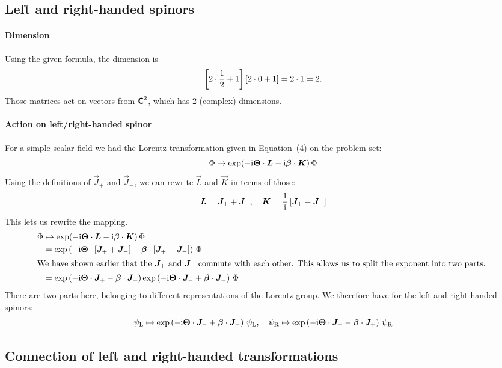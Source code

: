 \documentclass[11pt, english, fleqn, DIV=15, headinclude, BCOR=1cm]{scrartcl}
\begin{document}
\subsection{Left and right-handed spinors}

\paragraph{Dimension}

Using the given formula, the dimension is
\[
    \left[ 2 \cdot \frac12 + 1 \right] [2 \cdot 0 + 1] = 2 \cdot 1 = 2.
\]
Those matrices act on vectors from $\text{\bfseries\sffamily C}^2$, which has 2 (complex) dimensions.

\paragraph{Action on left/right-handed spinor}

For a simple scalar field we had the Lorentz transformation given in
Equation~(4) on the problem set:
\[
    \Phi \mapsto \exp(- \mathrm i \boldsymbol{\Theta} \cdot \boldsymbol{L} - \mathrm i \boldsymbol{\beta} \cdot
    \boldsymbol{K}) \, \Phi
\]
Using the definitions of $\vec J_+$ and $\vec J_-$, we can rewrite $\vec L$ and
$\vec K$ in terms of those:
\[
    \boldsymbol{L} = \boldsymbol{J}_+ + \boldsymbol{J}_-
    ,\quad
    \boldsymbol{K} = \frac1{\mathrm i} \left[ \boldsymbol{J}_+ - \boldsymbol{J}_- \right]
\]
This lets us rewrite the mapping.
\begin{align*}
    \Phi
    &\mapsto
    \exp(- \iup \vec \Theta \cdot \vec L - \iup \vec \beta \cdot
    \vec K) \, \Phi \\
    &= \exp\del{-\iup \vec\Theta\cdot\sbr{\vec J_+ + \vec J_-} - \vec
    \beta\cdot\sbr{\vec J_+ - \vec J_-}} \, \Phi \\
    \intertext{%
        We have shown earlier that the $\vec J_+$ and $\vec J_-$ commute with
        each other. This allows us to split the exponent into two parts.
    }
    &= \exp\del{-\iup \vec\Theta\cdot\vec J_+ - \vec \beta\cdot\vec J_+}
    \exp\del{-\iup \vec\Theta\cdot\vec J_- + \vec \beta\cdot \vec J_-}
    \, \Phi
\end{align*}
There are two parts here, belonging to different representations of the Lorentz
group. We therefore have for the left and right-handed spinors:
\[
    \psi_\text L \mapsto \exp\left( -\mathrm i \boldsymbol{\Theta}\cdot\boldsymbol{J}_- + \boldsymbol{\beta}\cdot \boldsymbol{J}_- \right) \,\psi_\text L
    ,\quad
    \psi_\text R \mapsto \exp\left( -\mathrm i \boldsymbol{\Theta}\cdot\boldsymbol{J}_+ - \boldsymbol{\beta}\cdot\boldsymbol{J}_+ \right) \,\psi_\text R
\]

\subsection{Connection of left and right-handed transformations}
\end{document}
